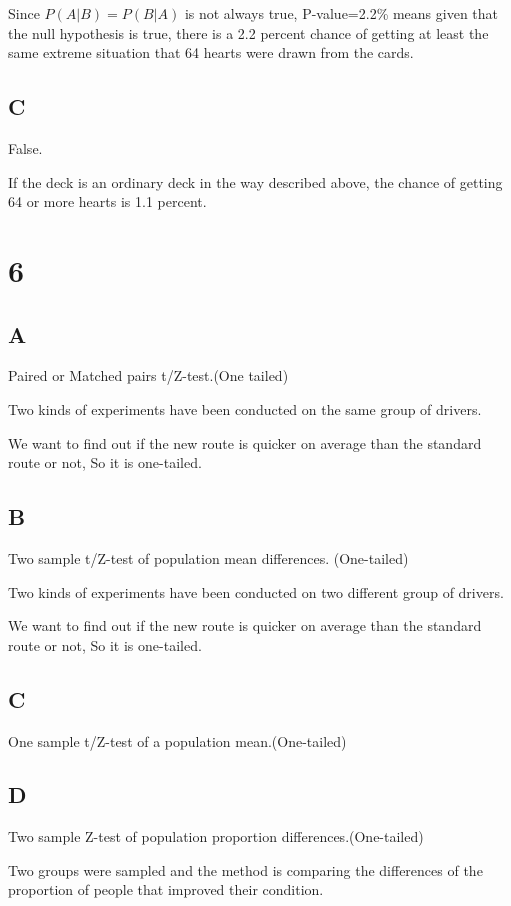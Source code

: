 \documentclass{article}
\begin{document}
Since $P(A|B)=P(B|A)$ is not always true, P-value=2.2\% means given that the null hypothesis is true, there is a 2.2 percent chance of getting at least the same extreme situation that 64 hearts were drawn from the cards.

\subsection*{C}

False.

If the deck is an ordinary deck in the way described above, the chance of
getting 64 or more hearts is 1.1 percent.

\section*{6}
\subsection*{A}
Paired or Matched pairs t/Z-test.(One tailed)

Two kinds of experiments have been conducted on the same group of drivers.

We want to find out if the new route is quicker on average
than the standard route or not, So it is one-tailed.

\subsection*{B}
Two sample t/Z-test of population mean differences. (One-tailed)

Two kinds of experiments have been conducted on two different group of drivers.

We want to find out if the new route is quicker on average
than the standard route or not, So it is one-tailed.

\subsection*{C}
One sample t/Z-test of a population mean.(One-tailed)



\subsection*{D}
Two sample Z-test of population proportion differences.(One-tailed)

Two groups were sampled and the method is comparing the differences of the proportion of people that improved their condition.
\end{document}
